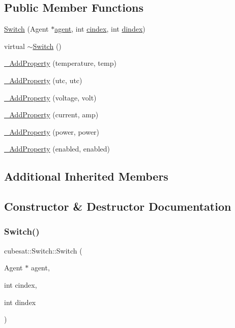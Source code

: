 \subsection*{Public Member Functions}
\begin{DoxyCompactItemize}
\item 
\hyperlink{classcubesat_1_1Switch_ae811a378efccae803369e8d2f8969714}{Switch} (Agent $\ast$\hyperlink{classcubesat_1_1Device_a8499108eccaf7375bea8ead0182391a6}{agent}, int \hyperlink{classcubesat_1_1Device_a1deca725b01f8ef37e49662da6db4e53}{cindex}, int \hyperlink{classcubesat_1_1Device_a8a2b3d6d7400e6796c31705058172982}{dindex})
\item 
virtual \hyperlink{classcubesat_1_1Switch_aa03f15d0d28b820aa30dc6332b04879d}{$\sim$\+Switch} ()
\item 
\hyperlink{classcubesat_1_1Switch_a9c96e1850b9e2dd008c637bf66d97df9}{\+\_\+\+Add\+Property} (temperature, temp)
\item 
\hyperlink{classcubesat_1_1Switch_ac9fc5ea7bddf6f072ca3207fd36881ec}{\+\_\+\+Add\+Property} (utc, utc)
\item 
\hyperlink{classcubesat_1_1Switch_adaaeca378060f385a9fd1e7128878a97}{\+\_\+\+Add\+Property} (voltage, volt)
\item 
\hyperlink{classcubesat_1_1Switch_a7e32d58e56c4b226a37375c359362c00}{\+\_\+\+Add\+Property} (current, amp)
\item 
\hyperlink{classcubesat_1_1Switch_a96d7136a9df4dca5557fd028d7290549}{\+\_\+\+Add\+Property} (power, power)
\item 
\hyperlink{classcubesat_1_1Switch_a8faf933b298ba873587115e42b6d7772}{\+\_\+\+Add\+Property} (enabled, enabled)
\end{DoxyCompactItemize}
\subsection*{Additional Inherited Members}


\subsection{Constructor \& Destructor Documentation}
\mbox{\label{classcubesat_1_1Switch_ae811a378efccae803369e8d2f8969714}} 
\subsubsection{\texorpdfstring{Switch()}{Switch()}}
{\footnotesize\ttfamily cubesat\+::\+Switch\+::\+Switch (\begin{DoxyParamCaption}\item[{Agent $\ast$}]{agent,  }\item[{int}]{cindex,  }\item[{int}]{dindex }\end{DoxyParamCaption})\hspace{0.3cm}{\ttfamily [inline]}}

